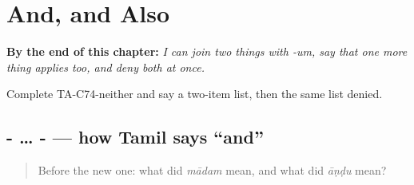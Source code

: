 
\chapter{And, and Also}
\label{ch:ta-and-and-also}

\begin{chapteropening}
\textbf{By the end of this chapter:} \emph{I can join two things with -um, say that one more thing applies too, and deny both at once.}

Complete TA-C74-neither and say a two-item list, then the same list denied.
\end{chapteropening}

\section[\texorpdfstring{-\ta{உம்} … -\ta{உம்} (-um … -um)}{-உம் … -உம் (-um … -um)}]{- … - — how Tamil says \textquotedblleft{}and\textquotedblright{}}

\label{lesson:TA-C74-and}



\begin{quote}
Before the new one: what did \emph{mādam} mean, and what did \emph{āṇḍu} mean?
\end{quote}

